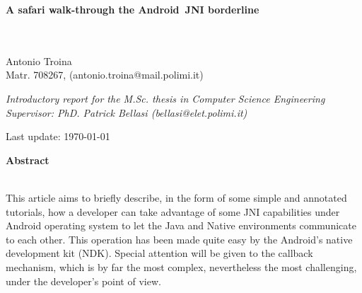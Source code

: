 \documentclass[a4paper,10pt]{article}
\newenvironment*{mytitle}{\begin{LARGE}\bf}{\end{LARGE}\\}%
\newenvironment*{mysubtitle}{\bf}{\\[1.5ex]}%
\newenvironment*{myabstract}{\begin{Large}\bf}{\end{Large}\\[2.5ex]}%
\begin{document}
\begin{mytitle}A safari walk-through the Android\texttrademark \ JNI borderline\end{mytitle}
%
%
\\
Antonio Troina\\
Matr. 708267, (antonio.troina@mail.polimi.it)\\
\hspace{10ex}
\begin{flushright}
\emph{Introductory report for the M.Sc. thesis in Computer Science Engineering}\\
\emph{Supervisor: PhD. Patrick Bellasi (bellasi@elet.polimi.it)}
\end{flushright}

Last update: \today
\\
\hspace{10ex}

\begin{myabstract} Abstract \end{myabstract}
This article aims to briefly describe, in the form of some simple and annotated
tutorials, how a developer can take advantage of some JNI capabilities under
Android operating system to let the Java and Native environments communicate to
each other. This operation has been made quite easy by the Android's native
development kit (NDK). Special attention will be given to the callback mechanism, 
which is by far the most complex, nevertheless the most challenging, under the
developer's point of view.
\end{document}
